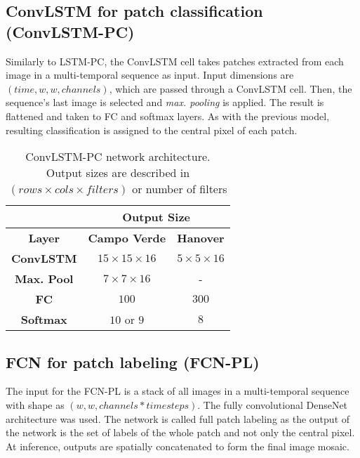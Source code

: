 \subsection{ConvLSTM for patch classification (ConvLSTM-PC)}

Similarly to LSTM-PC, the ConvLSTM cell takes patches extracted from each image in a multi-temporal sequence as input. Input dimensions are $(time, w, w, channels)$, which are passed through a ConvLSTM cell. Then, the sequence's last image is selected and \textit{max. pooling} is applied. The result is flattened and taken to FC and softmax layers. As with the previous model, resulting classification is assigned to the central pixel of each patch.
\vspace{0.5cm}



\begin{table}[h!]
\centering
\caption{ConvLSTM-PC network architecture. Output sizes are described in $(rows\times cols\times filters)$ or number of filters}
\label{table:convlstm}
\begin{tabular}{|c|c|c|}
\hline
\multicolumn{1}{|l|}{} & \multicolumn{2}{c|}{\textbf{Output Size}}     \\ \hline
\textbf{Layer}         & \textbf{Campo Verde}   & \textbf{Hanover}     \\ \hline
\textbf{ConvLSTM}      & $15\times 15\times 16$ & $5\times 5\times 16$ \\ \hline
\textbf{Max. Pool}     & $7\times 7\times 16$   & -                    \\ \hline
\textbf{FC}          & $100$                  & $300$                \\ \hline
\textbf{Softmax}       & $10$ or $9$              & $8$                  \\ \hline
\end{tabular}
\end{table}



\subsection{FCN for patch labeling (FCN-PL)}

The input for the FCN-PL is a stack of all images in a multi-temporal sequence with shape as $(w, w, channels*time steps)$. The fully convolutional DenseNet architecture was used. The network is called full patch labeling as the output of the network is the set of labels of the whole patch and not only the central pixel. At inference, outputs are spatially concatenated to form the final image mosaic.

 
